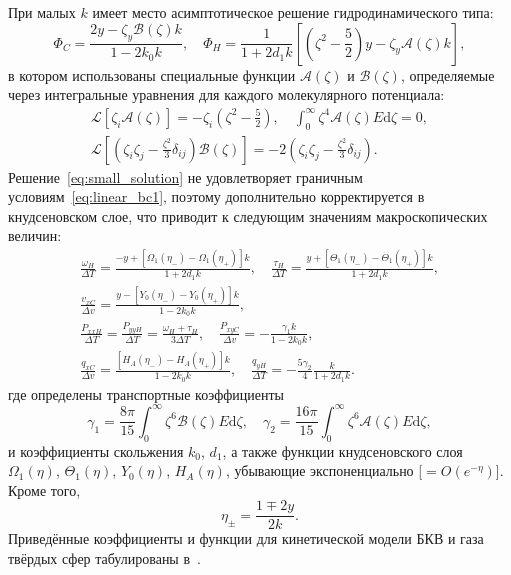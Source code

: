 \documentclass[a4paper,12pt]{article}
\newcommand{\dd}{\mathrm{d}}
\begin{document}
При малых \(k\) имеет место асимптотическое решение гидродинамического типа:
\begin{equation}\label{eq:small_solution}
    \Phi_C = \frac{2y - \zeta_y \mathcal{B}(\zeta) k}{1-2k_0k}, \quad
    \Phi_H = \frac1{1+2d_1k}\left[ \left(\zeta^2-\frac52\right)y
        - \zeta_y \mathcal{A}(\zeta)k \right],
\end{equation}
в котором использованы специальные функции \( \mathcal{A}(\zeta) \) и \( \mathcal{B}(\zeta) \),
определяемые через интегральные уравнения для каждого молекулярного потенциала:
\begin{gather}
    \mathcal{L}[\zeta_i \mathcal{A}(\zeta)] = -\zeta_i \left( \zeta^2 - \frac52 \right),
    \quad \int_0^\infty \zeta^4 \mathcal{A}(\zeta)E\dd\zeta = 0, \label{eq:def_A} \\
    \mathcal{L}\left[\left(\zeta_i\zeta_j-\frac{\zeta^2}3\delta_{ij}\right) \mathcal{B}(\zeta)\right]
        = -2 \left(\zeta_i\zeta_j-\frac{\zeta^2}3\delta_{ij}\right). \label{eq:def_B}
\end{gather}
Решение~\eqref{eq:small_solution} не удовлетворяет граничным условиям~\eqref{eq:linear_bc1},
поэтому дополнительно корректируется в кнудсеновском слое,
что приводит к следующим значениям макроскопических величин:
\begin{equation}\label{eq:small_macro}
    \begin{gathered}
    \frac{\omega_{H}}{\Delta{T}} = \frac{-y + [\Omega_1(\eta_-)-\Omega_1(\eta_+)]k}{1+2d_1k}, \quad
    \frac{\tau_{H}}{\Delta{T}} = \frac{y + [\Theta_1(\eta_-)-\Theta_1(\eta_+)]k}{1+2d_1k}, \\
    \frac{v_{xC}}{\Delta{v}} = \frac{y - [Y_0(\eta_-)-Y_0(\eta_+)]k}{1-2k_0k}, \\
    \frac{P_{xxH}}{\Delta{T}} = \frac{P_{yyH}}{\Delta{T}} = \frac{\omega_{H}+\tau_{H}}{3\Delta{T}}, \quad
    \frac{P_{xyC}}{\Delta{v}} = - \frac{\gamma_1 k}{1-2k_0k}, \\
    \frac{q_{xC}}{\Delta{v}} = \frac{[H_A(\eta_-)-H_A(\eta_+)]k}{1-2k_0k}, \quad
    \frac{q_{yH}}{\Delta{T}} = - \frac{5\gamma_2}4 \frac{k}{1+2d_1k}.
    \end{gathered}
\end{equation}
где определены транспортные коэффициенты
\begin{equation}\label{eq:transport_coeffs}
    \gamma_1 = \frac{8\pi}{15}\int_0^\infty \zeta^6 \mathcal{B}(\zeta)E\dd\zeta, \quad
    \gamma_2 = \frac{16\pi}{15}\int_0^\infty \zeta^6 \mathcal{A}(\zeta)E\dd\zeta,
\end{equation}
и коэффициенты скольжения \(k_0\), \(d_1\), а также функции кнудсеновского слоя
\(\Omega_1(\eta)\), \(\Theta_1(\eta)\), \(Y_0(\eta)\), \(H_A(\eta)\),
убывающие экспоненциально [\(=O(e^{-\eta})\)].
Кроме того,
\begin{equation}\label{eq:def_eta}
     \eta_\pm = \frac{1 \mp 2y}{2k}.
\end{equation}
Приведённые коэффициенты и функции для кинетической модели БКВ и газа твёрдых сфер
табулированы в~\cite{Sone2007}.
\end{document}
